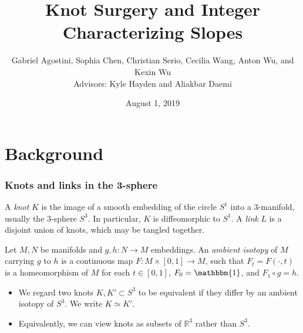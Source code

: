 \documentclass{beamer}
\title[Integer Characterizing Slopes]{Knot Surgery and Integer Characterizing Slopes}
\author[Agostini, Chen, Serio, Wang, Wu, and Wu\;\;\;]{Gabriel Agostini, Sophia Chen, Christian Serio, Cecilia Wang, Anton Wu, and Kexin Wu\\
Advisors: Kyle Hayden and Aliakbar Daemi}
\institute{Columbia University}
\date{August 1, 2019}
\theoremstyle{ex}
\theoremstyle{rem}
\begin{document}
	
	\begin{frame}
		\titlepage
	\end{frame}

\section{Background}
	\begin{frame}
		\frametitle{Knots and links in the 3-sphere}
		\begin{definition}
			A \textit{knot} $K$ is the image of a smooth embedding of the circle $S^1$ into a 3-manifold, usually the $3$-sphere $S^3$. In particular, $K$ is diffeomorphic to $S^1$. A \textit{link} $L$ is a disjoint union of knots, which may be tangled together.
		\end{definition}
		\begin{definition}
		Let $M,N$ be manifolds and $g,h\!:N\to M$ embeddings. An \textit{ambient isotopy} of $M$ carrying $g$ to $h$ is a continuous map $F\!:M\times[0,1]\to M$, such that $F_t=F(\cdot,t)$ is a homeomorphism of $M$ for each $t\in[0,1]$,  $F_0=\mathbbm{1}$, and $F_1\circ g = h$.
		\end{definition}
		\begin{itemize}
		\item We regard two knots $K,K'\subset S^3$ to be equivalent if they differ by an ambient isotopy of $S^3$. We write $K\simeq K'$.	
		\item Equivalently, we can view knots as subsets of $\mathbb{R}^3$ rather than $S^3$.
		
		\end{itemize}
	\end{frame}
\end{document}
